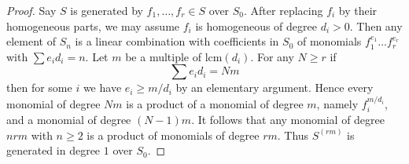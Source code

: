 \documentclass[10pt,a4paper]{amsart}
\theoremstyle{plain}
\theoremstyle{definition}
\theoremstyle{remark}
\numberwithin{equation}{subsection}
\begin{document}
\begin{proof}
Say $S$ is generated by $f_1, \ldots, f_r \in S$ over $S_0$.
After replacing $f_i$ by their homogeneous parts, we may assume
$f_i$ is homogeneous of degree $d_i > 0$. Then any element of
$S_n$ is a linear combination with coefficients in $S_0$ of monomials
$f_1^{e_1} \ldots f_r^{e_r}$ with $\sum e_i d_i = n$.
Let $m$ be a multiple of $\text{lcm}(d_i)$. For any $N \geq r$ if
$$
\sum e_i d_i = N m
$$
then for some $i$ we have $e_i \geq m/d_i$ by an elementary argument.
Hence every monomial of degree $N m$ is a product of a monomial
of degree $m$, namely $f_i^{m/d_i}$, and a monomial of degree $(N - 1)m$.
It follows that any monomial of degree $nrm$ with $n \geq 2$
is a product of monomials of degree $rm$. Thus $S^{(rm)}$ is generated
in degree $1$ over $S_0$.
\end{proof}
\end{document}
